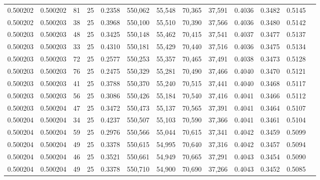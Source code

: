\begin{tabular}{rrrrrrrrrrrrr}
0.500202 & 0.500202 &    81 &  25 &                                     0.2358 & 550,062 &  55,548 &  70,365 &  37,591 & 0.4036 & 0.3482 & 0.5145 \\
0.500202 & 0.500203 &    38 &  25 &                                     0.3968 & 550,100 &  55,510 &  70,390 &  37,566 & 0.4036 & 0.3480 & 0.5142 \\
0.500203 & 0.500203 &    48 &  25 &                                     0.3425 & 550,148 &  55,462 &  70,415 &  37,541 & 0.4037 & 0.3477 & 0.5137 \\
0.500203 & 0.500203 &    33 &  25 &                                     0.4310 & 550,181 &  55,429 &  70,440 &  37,516 & 0.4036 & 0.3475 & 0.5134 \\
0.500203 & 0.500203 &    72 &  25 &                                     0.2577 & 550,253 &  55,357 &  70,465 &  37,491 & 0.4038 & 0.3473 & 0.5128 \\
0.500203 & 0.500203 &    76 &  25 &                                     0.2475 & 550,329 &  55,281 &  70,490 &  37,466 & 0.4040 & 0.3470 & 0.5121 \\
0.500203 & 0.500203 &    41 &  25 &                                     0.3788 & 550,370 &  55,240 &  70,515 &  37,441 & 0.4040 & 0.3468 & 0.5117 \\
0.500203 & 0.500203 &    56 &  25 &                                     0.3086 & 550,426 &  55,184 &  70,540 &  37,416 & 0.4041 & 0.3466 & 0.5112 \\
0.500203 & 0.500204 &    47 &  25 &                                     0.3472 & 550,473 &  55,137 &  70,565 &  37,391 & 0.4041 & 0.3464 & 0.5107 \\
0.500204 & 0.500204 &    34 &  25 &                                     0.4237 & 550,507 &  55,103 &  70,590 &  37,366 & 0.4041 & 0.3461 & 0.5104 \\
0.500204 & 0.500204 &    59 &  25 &                                     0.2976 & 550,566 &  55,044 &  70,615 &  37,341 & 0.4042 & 0.3459 & 0.5099 \\
0.500204 & 0.500204 &    49 &  25 &                                     0.3378 & 550,615 &  54,995 &  70,640 &  37,316 & 0.4042 & 0.3457 & 0.5094 \\
0.500204 & 0.500204 &    46 &  25 &                                     0.3521 & 550,661 &  54,949 &  70,665 &  37,291 & 0.4043 & 0.3454 & 0.5090 \\
0.500204 & 0.500204 &    49 &  25 &                                     0.3378 & 550,710 &  54,900 &  70,690 &  37,266 & 0.4043 & 0.3452 & 0.5085 \\

\end{tabular}
